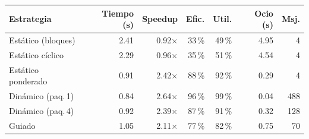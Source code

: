 \begin{tabular}{@{}lrrrrrr@{}}
\toprule
Estrategia & Tiempo (s) & Speedup & Efic. & Util. & Ocio (s) & Msj. \\
\midrule
Estático (bloques) & 2.41 & 0.92$\times$ & 33\,\% & 49\,\% & 4.95 & 4 \\
Estático cíclico & 2.29 & 0.96$\times$ & 35\,\% & 51\,\% & 4.54 & 4 \\
Estático ponderado & 0.91 & 2.42$\times$ & 88\,\% & 92\,\% & 0.29 & 4 \\
Dinámico (paq.\,1) & 0.84 & 2.64$\times$ & 96\,\% & 99\,\% & 0.04 & 488 \\
Dinámico (paq.\,4) & 0.92 & 2.39$\times$ & 87\,\% & 91\,\% & 0.32 & 128 \\
Guiado & 1.05 & 2.11$\times$ & 77\,\% & 82\,\% & 0.75 & 70 \\
\bottomrule
\end{tabular}
